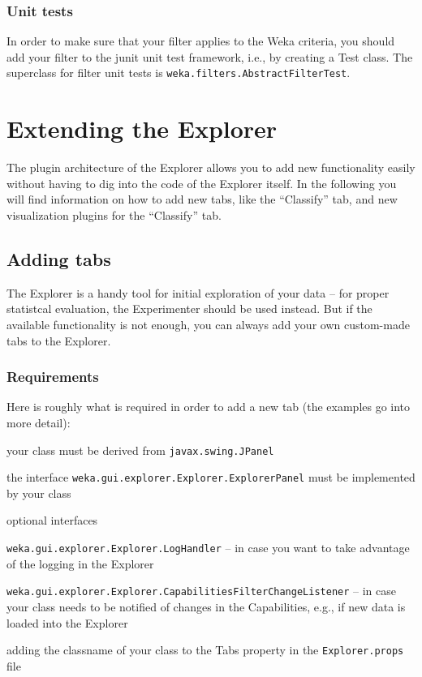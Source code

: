 \subsubsection{Unit tests}
In order to make sure that your filter applies to the Weka criteria, you
should add your filter to the junit unit test framework, i.e., by creating a
Test class. The superclass for filter unit tests is
\texttt{weka.filters.AbstractFilterTest}.


\newpage
\section{Extending the Explorer}
The plugin architecture of the Explorer allows you to add new functionality
easily without having to dig into the code of the Explorer itself. In the
following you will find information on how to add new tabs, like the
``Classify'' tab, and new visualization plugins for the ``Classify'' tab.

\subsection{Adding tabs}
The Explorer is a handy tool for initial exploration of your data -- for
proper statistcal evaluation, the Experimenter should be used instead. But if
the available functionality is not enough, you can always add your own
custom-made tabs to the Explorer.

\subsubsection{Requirements}
Here is roughly what is required in order to add a new tab (the examples go into
more detail):
\begin{tight_itemize}
  \item your class must be derived from \texttt{javax.swing.JPanel}
  \item the interface \texttt{weka.gui.explorer.Explorer.ExplorerPanel} must be
implemented by your class
  \item optional interfaces
  \begin{tight_itemize}
	\item \texttt{weka.gui.explorer.Explorer.LogHandler} -- in case
you want to take advantage of the logging in the Explorer
	\item \texttt{weka.gui.explorer.Explorer.CapabilitiesFilterChangeListener}
-- in case your class needs to be notified of changes in the
Capabilities, e.g., if new data is loaded into the Explorer
  \end{tight_itemize}
  \item adding the classname of your class to the Tabs property in the
\texttt{Explorer.props} file
\end{tight_itemize}

